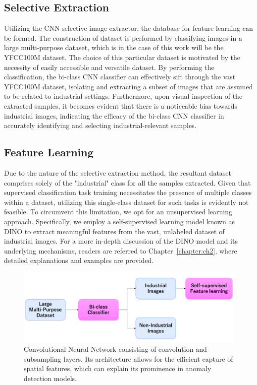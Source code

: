 \subsection{Selective Extraction}
\label{cnn selective extraction}
Utilizing the CNN selective image extractor, the database for feature learning can be formed. The construction of dataset is performed by classifying images in a large multi-purpose dataset, which is in the case of this work will be the YFCC100M dataset. The choice of this particular dataset is motivated by the necessity of easily accessible and versatile dataset. By performing the classification, the bi-class CNN classifier can effectively sift through the vast YFCC100M dataset, isolating and extracting a subset of images that are assumed to be related to industrial settings. Furthermore, upon visual inspection of the extracted samples, it becomes evident that there is a noticeable bias towards industrial images, indicating the efficacy of the bi-class CNN classifier in accurately identifying and selecting industrial-relevant samples.

\subsection{Feature Learning}
\label{feature learning cnn}
Due to the nature of the selective extraction method, the resultant dataset comprises solely of the "industrial" class for all the samples extracted. Given that supervised classification task training necessitates the presence of multiple classes within a dataset, utilizing this single-class dataset for such tasks is evidently not feasible. To circumvent this limitation, we opt for an unsupervised learning approach. Specifically, we employ a self-supervised learning model known as DINO to extract meaningful features from the vast, unlabeled dataset of industrial images. For a more in-depth discussion of the DINO model and its underlying mechanisms, readers are referred to Chapter~\ref{chapter:ch2}, where detailed explanations and examples are provided.

\begin{figure}[t]
	\begin{center}
		\includegraphics[width=1.0\linewidth]{Chapter_3/cnn_extraction.png}
	\end{center}
	\caption{Convolutional Neural Network consisting of convolution and subsampling layers. Its architecture allows for the efficient capture of spatial features, which can explain its prominence in anomaly detection models.}
	\label{fig:cnn}
\end{figure} 	

